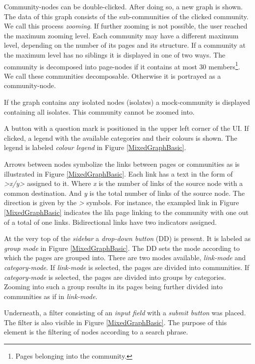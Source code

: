 Community-nodes can be double-clicked. After doing so, a new graph is shown. The data of this graph consists of the sub-communities of the clicked community. We call this process \textit{zooming}. If further zooming is not possible, the user reached the maximum zooming level. Each community may have a different maximum level, depending on the number of its pages and its structure. If a community at the maximum level has no siblings it is displayed in one of two ways. The community is decomposed into page-nodes if it contains at most 30 members\footnote{Pages belonging into the community.}. We call these communities decomposable. Otherwise it is portrayed as a community-node.

If the graph contains any isolated nodes (isolates) a mock-community is displayed containing all isolates. This community cannot be zoomed into. 

A button with a question mark is positioned in the upper left corner of the UI. If clicked, a legend with the available categories and their colours is shown. The legend is labeled \textit{colour legend} in Figure \ref{MixedGraphBasic}.

Arrows between nodes symbolize the links between pages or communities as is illustrated in Figure \ref{MixedGraphBasic}. Each link has a text in the form of \textit{>x/y>} assigned to it. Where \textit{x} is the number of links of the source node with a common destination. And \textit{y} is the total number of links of the source node. The direction is given by the \textit{>} symbols. For instance, the exampled link in Figure \ref{MixedGraphBasic} indicates the lila page linking to the community with one out of a total of one links. Bidirectional links have two indicators assigned.

At the very top of the \textit{sidebar} a \textit{drop-down button} (DD) is present. It is labeled as \textit{group mode} in Figure \ref{MixedGraphBasic}. The DD sets the mode according to which the pages are grouped into. There are two modes available, \textit{link-mode} and \textit{category-mode}. If \textit{link-mode} is selected, the pages are divided into communities. If \textit{category-mode} is selected, the pages are divided into groups by categories. Zooming into such a group results in its pages being further divided into communities as if in \textit{link-mode}. 

Underneath, a filter consisting of an \textit{input field} with a \textit{submit button} was placed. The filter is also visible in Figure \ref{MixedGraphBasic}. The purpose of this element is the filtering of nodes according to a search phrase.

